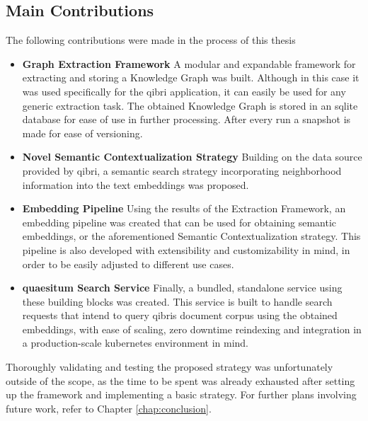 \documentclass[draft,final]{vutinfth} %
\begin{document}
\subsection{Main Contributions}
The following contributions were made in the process of this thesis
\begin{itemize}
    \item \textbf{Graph Extraction Framework} A modular and expandable framework for extracting and storing a Knowledge Graph was built. Although in this case it was used specifically for the qibri application, it can easily be used for any generic extraction task. The obtained Knowledge Graph is stored in an sqlite database for ease of use in further processing. After every run a snapshot is made for ease of versioning.
    \item \textbf{Novel Semantic Contextualization Strategy} Building on the data source provided by qibri, a semantic search strategy incorporating neighborhood information into the text embeddings was proposed.
    \item \textbf{Embedding Pipeline} Using the results of the Extraction Framework, an embedding pipeline was created that can be used for obtaining semantic embeddings, or the aforementioned Semantic Contextualization strategy. This pipeline is also developed with extensibility and customizability in mind, in order to be easily adjusted to different use cases.
    \item \textbf{quaesitum Search Service} Finally, a bundled, standalone service using these building blocks was created. This service is built to handle search requests that intend to query qibris document corpus using the obtained embeddings, with ease of scaling, zero downtime reindexing and integration in a production-scale kubernetes environment in mind.
\end{itemize}
Thoroughly validating and testing the proposed strategy was unfortunately outside of the scope, as the time to be spent was already exhausted after setting up the framework and implementing a basic strategy. For further plans involving future work, refer to Chapter \ref{chap:conclusion}.
\end{document}
